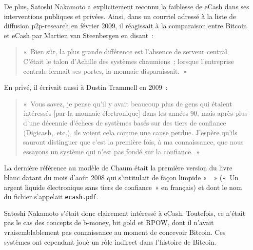 De plus, Satoshi Nakamoto a explicitement reconnu la faiblesse de eCash dans ses interventions publiques et privées. Ainsi, dans un courriel adressé à la liste de diffusion p2p-research en février 2009, il réagissait à la comparaison entre Bitcoin et eCash par Martien van Steenbergen en disant~:

\begin{quote}
«~Bien sûr, la plus grande différence est l'absence de serveur central. C'était le talon d'Achille des systèmes chaumiens~; lorsque l'entreprise centrale fermait ses portes, la monnaie disparaissait.~»
\end{quote} %

En privé, il écrivait aussi à Dustin Trammell en 2009~:

\begin{quote}
«~Vous savez, je pense qu'il y avait beaucoup plus de gens qui étaient intéressés [par la monnaie électronique] dans les années 90, mais après plus d'une décennie d'échecs de systèmes basés sur des tiers de confiance (Digicash,~etc.), ils voient cela comme une cause perdue. J'espère qu'ils sauront distinguer que c'est la première fois, à ma connaissance, que nous essayons un système qui n'est pas fondé sur la confiance.~»
\end{quote}

La dernière référence au modèle de Chaum était la première version du livre blanc datant du mois d'août 2008 qui s'intitulait de façon limpide «~~» («~Un argent liquide électronique sans tiers de confiance~» en français) et dont le nom du fichier s'appelait \texttt{ecash.pdf}.

Satoshi Nakamoto s'était donc clairement intéressé à eCash. Toutefois, ce n'était pas le cas des concepts de b-money, bit gold et RPOW, dont il n'avait vraisemblablement pas connaissance au moment de concevoir Bitcoin. Ces systèmes ont cependant joué un rôle indirect dans l'histoire de Bitcoin.

